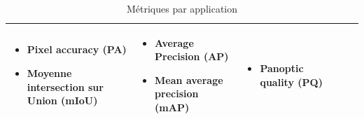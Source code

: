 \begin{table}[H]
\begin{tabular}{|p{1.8cm}|p{2.1cm}|p{2.4cm}|p{2.5cm}|p{2.2cm}|p{2.2cm}|}
\begin{itemize}[leftmargin=*, topsep=0pt, itemsep=0pt, parsep=0pt, before=\vspace{-\baselineskip}, after=\vspace{-\baselineskip}]
        \item Pixel accuracy (PA)
        \item Moyenne intersection sur Union (mIoU)
    \end{itemize} & 
    \begin{itemize}[leftmargin=*, topsep=0pt, itemsep=0pt, parsep=0pt, before=\vspace{-\baselineskip}, after=\vspace{-\baselineskip}]
        \item Average Precision (AP)
        \item Mean average precision (mAP)
    \end{itemize} & 
    \begin{itemize}[leftmargin=*, topsep=0pt, itemsep=0pt, parsep=0pt, before=\vspace{-\baselineskip}, after=\vspace{-\baselineskip}]
        \item Panoptic quality (PQ)
    \end{itemize} \\
    \hline
    \end{tabular}
    \caption{Métriques par application}
    \label{tab:metrics_by_application}
\end{table}
